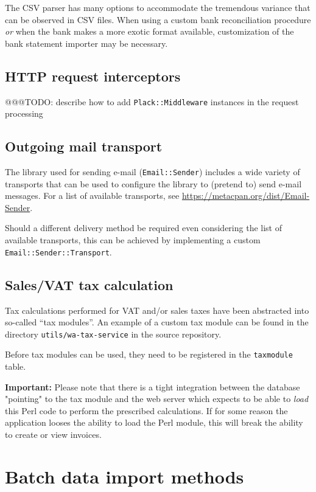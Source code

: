 The CSV parser has many options to accommodate the tremendous variance that can be
observed in CSV files.  When using a custom bank reconciliation procedure \textit{or}
when the bank makes a more exotic format available, customization of the bank statement
importer may be necessary.

\section{HTTP request interceptors}

@@@TODO: describe how to add \texttt{Plack::Middleware} instances in the request processing

\section{Outgoing mail transport}

The library used for sending e-mail (\texttt{Email::Sender})
includes a wide variety of transports that can be used to configure the library to (pretend to) send
e-mail messages.  For a list of available transports, see \url{https://metacpan.org/dist/Email-Sender}.

Should a different delivery method be required even considering the list of available transports,
this can be achieved by implementing a custom \texttt{Email::Sender::Transport}.

\section{Sales/VAT tax calculation}

Tax calculations performed for VAT and/or sales taxes have been abstracted into so-called
``tax modules''.  An example of a custom tax module can be found in the directory
\texttt{utils/wa-tax-service} in the source repository.

Before tax modules can be used, they need to be registered in the \texttt{taxmodule} table.

\textbf{Important:} Please note that there is a tight integration between the database "pointing"
to the tax module and the web server which expects to be able to \textit{load} this Perl code to
perform the prescribed calculations.
If for some reason the application looses the ability to load the Perl module, this will break
the ability to create or view invoices.

\chapter{Batch data import methods}
\label{cha-customization-batch-import}

